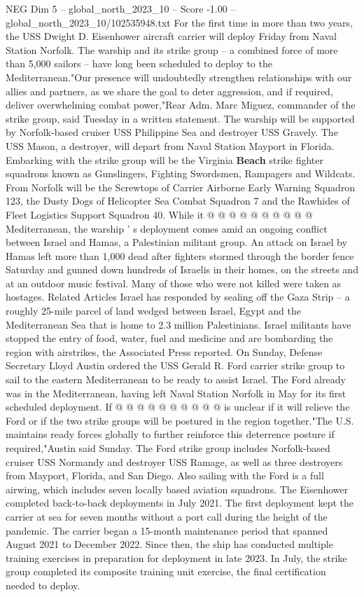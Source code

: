 \begin{textsample}{NEG Dim 5 – global\_north\_2023\_10 – Score -1.00 – global\_north\_2023\_10/102535948.txt}  \label{ex:f5_neg_022}
For the first time in more than two years, the USS Dwight D.
Eisenhower aircraft carrier will deploy Friday from Naval Station Norfolk.
The warship and its strike group -- a combined force of more than 5,000 sailors -- have long been scheduled to deploy to the Mediterranean."Our presence will undoubtedly strengthen relationships with our allies and partners, as we share the goal to deter aggression, and if required, deliver overwhelming combat power,"Rear Adm.
Marc Miguez, commander of the strike group, said Tuesday in a written statement.
The warship will be supported by Norfolk-based cruiser USS Philippine Sea and destroyer USS Gravely.
The USS Mason, a destroyer, will depart from Naval Station Mayport in Florida.
Embarking with the strike group will be the Virginia \textbf{Beach} strike fighter squadrons known as Gunslingers, Fighting Swordsmen, Rampagers and Wildcats.
From Norfolk will be the Screwtops of Carrier Airborne Early Warning Squadron 123, the Dusty Dogs of Helicopter Sea Combat Squadron 7 and the Rawhides of Fleet Logistics Support Squadron 40.
While it @ @ @ @ @ @ @ @ @ @ Mediterranean, the warship ' s deployment comes amid an ongoing conflict between Israel and Hamas, a Palestinian militant group.
An attack on Israel by Hamas left more than 1,000 dead after fighters stormed through the border fence Saturday and gunned down hundreds of Israelis in their homes, on the streets and at an outdoor music festival.
Many of those who were not killed were taken as hostages.
Related Articles Israel has responded by sealing off the Gaza Strip -- a roughly 25-mile parcel of land wedged between Israel, Egypt and the Mediterranean Sea that is home to 2.3 million Palestinians.
Israel militants have stopped the entry of food, water, fuel and medicine and are bombarding the region with airstrikes, the Associated Press reported.
On Sunday, Defense Secretary Lloyd Austin ordered the USS Gerald R.
Ford carrier strike group to sail to the eastern Mediterranean to be ready to assist Israel.
The Ford already was in the Mediterranean, having left Naval Station Norfolk in May for its first scheduled deployment.
If @ @ @ @ @ @ @ @ @ @ is unclear if it will relieve the Ford or if the two strike groups will be postured in the region together."The U.S. maintains ready forces globally to further reinforce this deterrence posture if required,"Austin said Sunday.
The Ford strike group includes Norfolk-based cruiser USS Normandy and destroyer USS Ramage, as well as three destroyers from Mayport, Florida, and San Diego.
Also sailing with the Ford is a full airwing, which includes seven locally based aviation squadrons.
The Eisenhower completed back-to-back deployments in July 2021.
The first deployment kept the carrier at sea for seven months without a port call during the height of the pandemic.
The carrier began a 15-month maintenance period that spanned August 2021 to December 2022.
Since then, the ship has conducted multiple training exercises in preparation for deployment in late 2023.
In July, the strike group completed its composite training unit exercise, the final certification needed to deploy.

\end{textsample}

